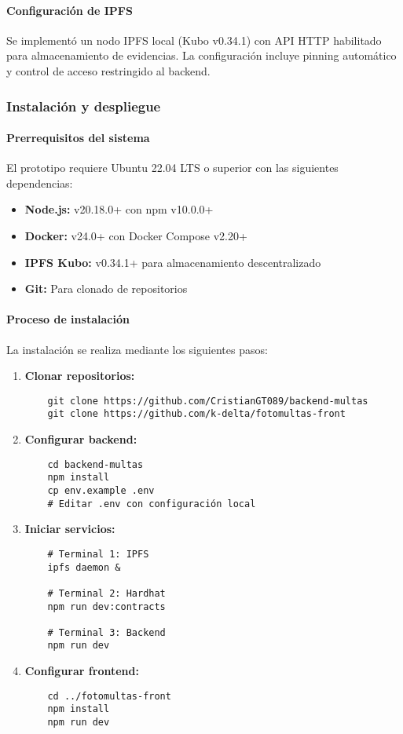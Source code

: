 \paragraph{Configuración de IPFS}
Se implementó un nodo IPFS local (Kubo v0.34.1) con API HTTP habilitado para almacenamiento de evidencias. La configuración incluye pinning automático y control de acceso restringido al backend.

\subsubsection{Instalación y despliegue}

\paragraph{Prerrequisitos del sistema}
El prototipo requiere Ubuntu 22.04 LTS o superior con las siguientes dependencias:
\begin{itemize}
    \item \textbf{Node.js:} v20.18.0+ con npm v10.0.0+
    \item \textbf{Docker:} v24.0+ con Docker Compose v2.20+
    \item \textbf{IPFS Kubo:} v0.34.1+ para almacenamiento descentralizado
    \item \textbf{Git:} Para clonado de repositorios
\end{itemize}

\paragraph{Proceso de instalación}
La instalación se realiza mediante los siguientes pasos:

\begin{enumerate}
    \item \textbf{Clonar repositorios:}
    \begin{verbatim}
    git clone https://github.com/CristianGT089/backend-multas
    git clone https://github.com/k-delta/fotomultas-front
    \end{verbatim}
    
    \item \textbf{Configurar backend:}
    \begin{verbatim}
    cd backend-multas
    npm install
    cp env.example .env
    # Editar .env con configuración local
    \end{verbatim}
    
    \item \textbf{Iniciar servicios:}
    \begin{verbatim}
    # Terminal 1: IPFS
    ipfs daemon &
    
    # Terminal 2: Hardhat
    npm run dev:contracts
    
    # Terminal 3: Backend
    npm run dev
    \end{verbatim}
    
    \item \textbf{Configurar frontend:}
    \begin{verbatim}
    cd ../fotomultas-front
    npm install
    npm run dev
    \end{verbatim}
\end{enumerate}

